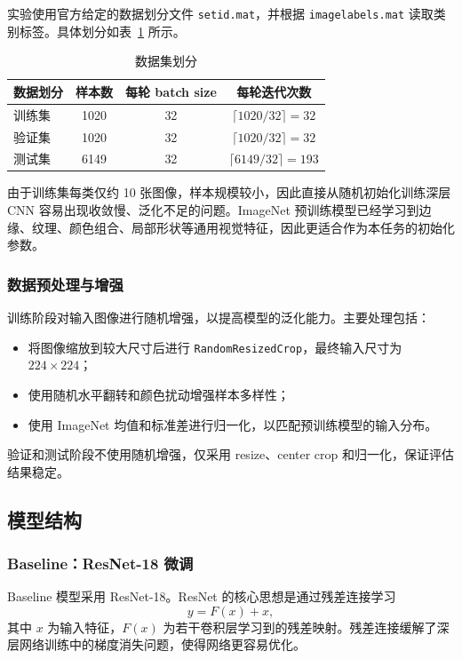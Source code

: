 \documentclass{article}
\begin{document}
实验使用官方给定的数据划分文件 \texttt{setid.mat}，并根据 \texttt{imagelabels.mat} 读取类别标签。具体划分如表~\ref{tab:task1_data_split} 所示。

\begin{table}[H]
\centering
\caption{数据集划分}
\label{tab:task1_data_split}
\begin{tabular}{lccc}
\toprule
数据划分 & 样本数 & 每轮 batch size & 每轮迭代次数 \\
\midrule
训练集 & 1020 & 32 & $\lceil 1020/32\rceil=32$ \\
验证集 & 1020 & 32 & $\lceil 1020/32\rceil=32$ \\
测试集 & 6149 & 32 & $\lceil 6149/32\rceil=193$ \\
\bottomrule
\end{tabular}
\end{table}

由于训练集每类仅约 10 张图像，样本规模较小，因此直接从随机初始化训练深层 CNN 容易出现收敛慢、泛化不足的问题。ImageNet 预训练模型已经学习到边缘、纹理、颜色组合、局部形状等通用视觉特征，因此更适合作为本任务的初始化参数。

\subsubsection{数据预处理与增强}
训练阶段对输入图像进行随机增强，以提高模型的泛化能力。主要处理包括：
\begin{itemize}
    \item 将图像缩放到较大尺寸后进行 \texttt{RandomResizedCrop}，最终输入尺寸为 $224\times224$；
    \item 使用随机水平翻转和颜色扰动增强样本多样性；
    \item 使用 ImageNet 均值和标准差进行归一化，以匹配预训练模型的输入分布。
\end{itemize}
验证和测试阶段不使用随机增强，仅采用 resize、center crop 和归一化，保证评估结果稳定。

\subsection{模型结构}
\subsubsection{Baseline：ResNet-18 微调}
Baseline 模型采用 ResNet-18。ResNet 的核心思想是通过残差连接学习
\[
    y = F(x) + x,
\]
其中 $x$ 为输入特征，$F(x)$ 为若干卷积层学习到的残差映射。残差连接缓解了深层网络训练中的梯度消失问题，使得网络更容易优化。
\end{document}
